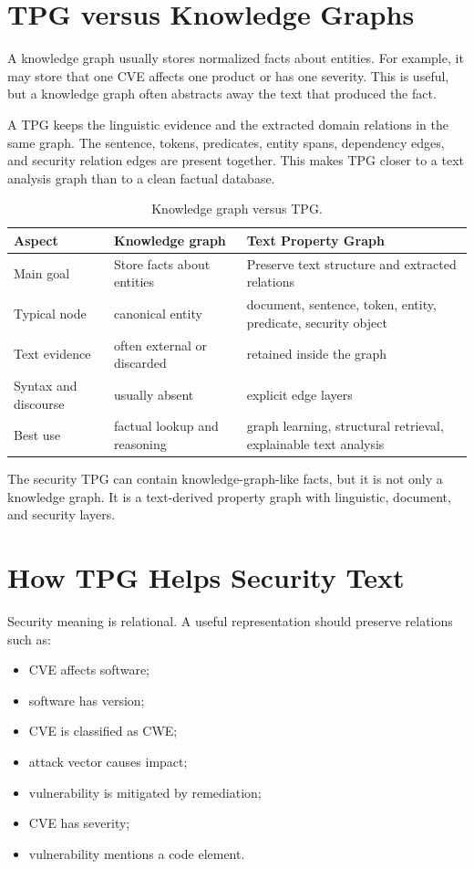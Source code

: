 \documentclass[11pt]{article}
\begin{document}
\section{TPG versus Knowledge Graphs}

A knowledge graph usually stores normalized facts about entities. For example,
it may store that one CVE affects one product or has one severity. This is
useful, but a knowledge graph often abstracts away the text that produced the
fact.

A TPG keeps the linguistic evidence and the extracted domain relations in the
same graph. The sentence, tokens, predicates, entity spans, dependency edges,
and security relation edges are present together. This makes TPG closer to a
text analysis graph than to a clean factual database.

\begin{table}[h]
\centering
\small
\begin{tabular}{p{}p{}p{}}
\toprule
Aspect & Knowledge graph & Text Property Graph \\
\midrule
Main goal & Store facts about entities & Preserve text structure and extracted relations \\
Typical node & canonical entity & document, sentence, token, entity, predicate, security object \\
Text evidence & often external or discarded & retained inside the graph \\
Syntax and discourse & usually absent & explicit edge layers \\
Best use & factual lookup and reasoning & graph learning, structural retrieval, explainable text analysis \\
\bottomrule
\end{tabular}
\caption{Knowledge graph versus TPG.}
\end{table}

The security TPG can contain knowledge-graph-like facts, but it is not only a
knowledge graph. It is a text-derived property graph with linguistic, document,
and security layers.

\section{How TPG Helps Security Text}

Security meaning is relational. A useful representation should preserve
relations such as:

\begin{itemize}
    \item CVE affects software;
    \item software has version;
    \item CVE is classified as CWE;
    \item attack vector causes impact;
    \item vulnerability is mitigated by remediation;
    \item CVE has severity;
    \item vulnerability mentions a code element.
\end{itemize}
\end{document}
